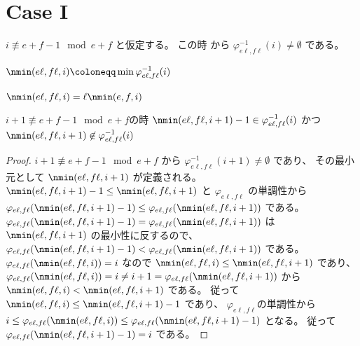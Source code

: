 \section{Case I}

$
i \not \equiv e + f - 1 \mod e + f
$
と仮定する。
この時
から
$
\varphi_{e \ell, f \ell}^{-1}(i)
\ne
\emptyset
$
である。

\begin{definition}
\label{df:main_lemma.n_min_l}
\leanok
$
\nmin(e \ell, f \ell, i)
\coloneqq
\min \varphi_{e \ell, f \ell}^{-1}(i)
$
\end{definition}

\begin{lemma}
\label{lm:main_lemma.min_l_eq_l_mul_min_1}
\leanok
$
\nmin(e \ell, f \ell, i) = \ell \nmin(e, f, i)
$
\end{lemma}

\begin{lemma}
\label{lm:main_lemma.case_a}
\leanok
$i + 1 \not \equiv e + f - 1 \mod e + f$の時
$
\nmin (e \ell, f \ell, i+1) - 1
\in
\varphi_{e \ell, f \ell}^{-1}(i)
$
かつ
$
\nmin (e \ell, f \ell, i+1)
\not \in
\varphi_{e \ell, f \ell}^{-1}(i)
$
\end{lemma}

\begin{proof}
$
i + 1 \not \equiv e + f - 1 \mod e + f
$
から
$
\varphi_{e \ell, f \ell}^{-1}(i+1) \ne \emptyset
$
であり、
その最小元として
$
\nmin (e \ell, f \ell, i+1)
$
が定義される。
$
\nmin (e \ell, f \ell, i+1) - 1
\le
\nmin (e \ell, f \ell, i+1)
$
と
$
\varphi_{e \ell, f \ell}
$
の単調性から
$
\varphi_{e \ell, f \ell}(\nmin (e \ell, f \ell, i+1) - 1)
\le
\varphi_{e \ell, f \ell}(\nmin (e \ell, f \ell, i+1))
$
である。
$
\varphi_{e \ell, f \ell}(\nmin (e \ell, f \ell, i+1) - 1)
=
\varphi_{e \ell, f \ell}(\nmin (e \ell, f \ell, i+1))
$
は
$
\nmin (e \ell, f \ell, i+1)
$
の最小性に反するので、
$
\varphi_{e \ell, f \ell}(\nmin (e \ell, f \ell, i+1) - 1)
<
\varphi_{e \ell, f \ell}(\nmin (e \ell, f \ell, i+1))
$
である。
$
\varphi_{e \ell, f \ell}(\nmin (e \ell, f \ell, i)) = i
$
なので
$
\nmin (e \ell, f \ell, i)
\le
\nmin (e \ell, f \ell, i+1)
$
であり、
$
\varphi_{e \ell, f \ell}(\nmin (e \ell, f \ell, i))
=
i
\ne
i+1
=
\varphi_{e \ell, f \ell}(\nmin (e \ell, f \ell, i+1))
$
から
$
\nmin (e \ell, f \ell, i)
<
\nmin (e \ell, f \ell, i+1)
$
である。
従って
$
\nmin (e \ell, f \ell, i)
\le
\nmin (e \ell, f \ell, i+1) - 1
$
であり、
$\varphi_{e \ell, f \ell}$の単調性から
$
i
\le
\varphi_{e \ell, f \ell}( \nmin (e \ell, f \ell, i))
\le
\varphi_{e \ell, f \ell}( \nmin (e \ell, f \ell, i+1) - 1 )
$
となる。
従って
$
\varphi_{e \ell, f \ell}( \nmin (e \ell, f \ell, i+1) - 1 )
= i
$
である。
\end{proof}

